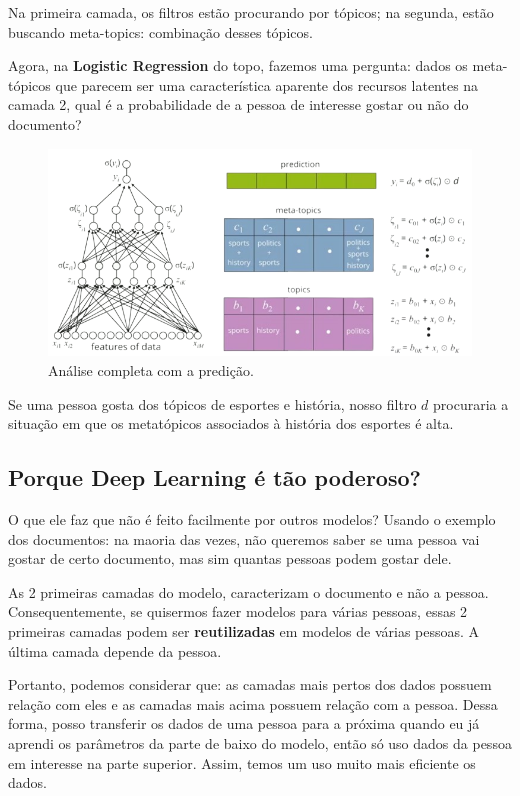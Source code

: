 \documentclass[11pt, a4paper]{article}
\begin{document}
Na primeira camada, os filtros estão procurando por tópicos; na segunda, estão buscando meta-topics: combinação desses tópicos.

Agora, na \textbf{Logistic Regression} do topo, fazemos uma pergunta: dados os meta-tópicos que parecem ser uma característica aparente dos recursos latentes na camada 2, qual é a probabilidade de a pessoa de interesse gostar ou não do documento?


\begin{figure}[h]
\centering
\includegraphics[scale=0.3]{11thMTP}
\caption{Análise completa com a predição.}
\end{figure}

Se uma pessoa gosta dos tópicos de esportes e história, nosso filtro $d$ procuraria a situação em que os metatópicos associados à história dos esportes é alta.

\subsection{Porque Deep Learning é tão poderoso?}

O que ele faz que não é feito facilmente por outros modelos? Usando o exemplo dos documentos: na maoria das vezes, não queremos saber se uma pessoa vai gostar de certo documento, mas sim quantas pessoas podem gostar dele. 

As 2 primeiras camadas do modelo, caracterizam o documento e não a pessoa. Consequentemente, se quisermos fazer modelos para várias pessoas, essas 2 primeiras camadas podem ser \textbf{reutilizadas} em modelos de várias pessoas. A última camada depende da pessoa.

Portanto, podemos considerar que: as camadas mais pertos dos dados possuem relação com eles e as camadas mais acima possuem relação com a pessoa. Dessa forma, posso transferir os dados de uma pessoa para a próxima quando eu já aprendi os parâmetros da parte de baixo do modelo, então só uso dados da pessoa em interesse na parte superior. Assim, temos um uso muito mais eficiente os dados.
\end{document}
